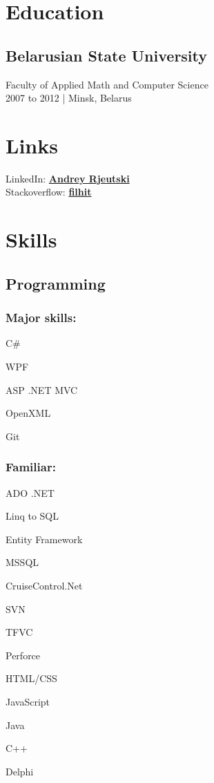 \documentclass[a4paper,11pt]{article}
\newcommand{\periodandlocation}[1]{{\small #1}}
\begin{document}
  \vspace{1cm}
  \begin{minipage}[t]{0.34\textwidth}
    \section*{Education} 
    \subsection*{Belarusian State University}
    Faculty of Applied Math and Computer Science\\
	\periodandlocation{2007 to 2012 | Minsk, Belarus}
    \section*{Links} 
    LinkedIn: \href{https://linkedin.com/in/andrey-rjeutski-92064741}{\bf Andrey Rjeutski} \\
    Stackoverflow: \href{http://stackoverflow.com/users/3506292/filhit}{\bf filhit}
    \section*{Skills}
    \subsection*{Programming}
    \subsubsection*{Major skills:}
	\begin{inparaitem}
      \item C\# 
	  \item WPF
	  \item ASP .NET MVC
	  \item OpenXML
	  \item Git
	\end{inparaitem}
    \subsubsection*{Familiar:}
	\begin{inparaitem}
      \item ADO .NET 
	  \item Linq to SQL
	  \item Entity Framework
	  \item MSSQL
	  \item CruiseControl.Net
	  \item SVN
	  \item TFVC
	  \item Perforce
	  \item HTML/CSS
	  \item JavaScript
	  \item Java
	  \item C++
	  \item Delphi
	\end{inparaitem}

\end{minipage}
\end{document}
